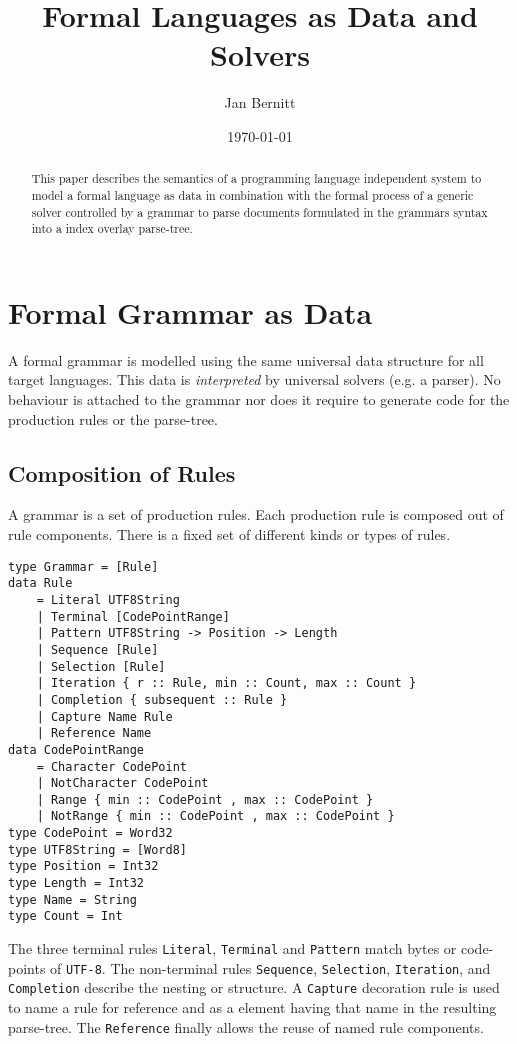 \documentclass[10pt,a4paper]{article}
\begin{document}
\lstset{language=Haskell}
\title{Formal Languages as Data and Solvers}
\author{Jan Bernitt}
\date{\today}
\maketitle

\begin{abstract}
\noindent This paper describes the semantics of a programming language independent system to model a formal language as data in combination with the formal process of a generic solver controlled by a grammar to parse documents formulated in the grammars syntax into a index overlay parse-tree.
\end{abstract}
\section{Formal Grammar as Data}
A formal grammar is modelled using the same universal data structure for all target languages. This data is \emph{interpreted} by universal solvers (e.g. a parser). No behaviour is attached to the grammar nor does it require to generate code for the production rules or the parse-tree.

\subsection{Composition of Rules}
A grammar is a set of production rules. Each production rule is composed out of rule components. There is a fixed set of different kinds or types of rules.
\begin{lstlisting}
type Grammar = [Rule]
data Rule
	= Literal UTF8String
	| Terminal [CodePointRange]
	| Pattern UTF8String -> Position -> Length
	| Sequence [Rule]
	| Selection [Rule]
	| Iteration { r :: Rule, min :: Count, max :: Count }
	| Completion { subsequent :: Rule }
	| Capture Name Rule
	| Reference Name
data CodePointRange
	= Character CodePoint
	| NotCharacter CodePoint
	| Range { min :: CodePoint , max :: CodePoint }
	| NotRange { min :: CodePoint , max :: CodePoint }
type CodePoint = Word32
type UTF8String = [Word8]
type Position = Int32
type Length = Int32
type Name = String
type Count = Int
\end{lstlisting}
 The three terminal rules \texttt{Literal}, \texttt{Terminal} and \texttt{Pattern} match bytes or code-points of \texttt{UTF-8}. The non-terminal rules \texttt{Sequence}, \texttt{Selection}, \texttt{Iteration}, and \texttt{Completion} describe the nesting or structure. A \texttt{Capture} decoration rule is used to name a rule for reference and as a element having that name in the resulting parse-tree. The \texttt{Reference} finally allows the reuse of named rule components.
\end{document}
